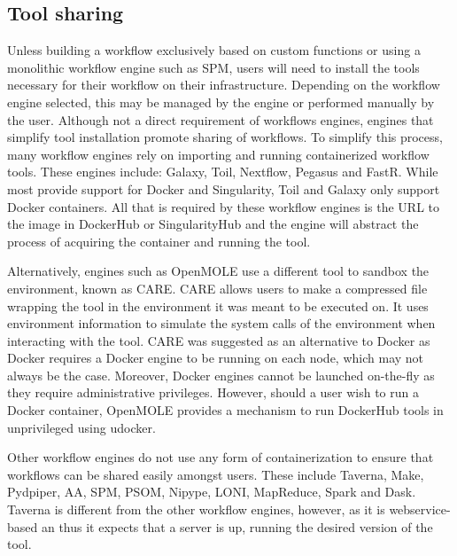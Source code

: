        \subsection{Tool sharing}\label{sharing}

            Unless building a workflow exclusively based on custom
            functions or using a monolithic workflow engine such as SPM, users
            will need to install the tools necessary for their workflow on
            their infrastructure. Depending on the workflow engine 
            selected, this may be managed by the engine or performed manually 
            by the user. Although not a direct requirement of workflows engines, 
            engines that simplify tool installation promote sharing of 
            workflows. To simplify this process, many workflow engines rely on 
            importing and running containerized workflow tools. These engines
            include: Galaxy, Toil, Nextflow, Pegasus and FastR. While most 
            provide support for Docker and Singularity, Toil and Galaxy only 
            support Docker containers. All that is required by these workflow 
            engines is the URL to the image in DockerHub or SingularityHub and
            the engine will abstract the process of acquiring the container and
            running the tool.

            Alternatively, engines such as OpenMOLE use a different tool to
            sandbox the environment, known as CARE. CARE allows 
            users to make a compressed file wrapping the tool in the 
            environment it was meant to be executed on. It uses environment 
            information to simulate the system calls of the environment when
            interacting with the tool. CARE was suggested as an alternative to
            Docker as Docker requires a Docker engine to be running on each 
            node, which may not always be the case. Moreover, Docker engines 
            cannot be launched on-the-fly as they require administrative 
            privileges. However, should a user wish to run a Docker container,
            OpenMOLE provides a mechanism to run DockerHub tools in 
            unprivileged using udocker.

            Other workflow engines do not use any form of containerization to
            ensure that workflows can be shared easily amongst users. These 
            include Taverna, Make, Pydpiper, AA, SPM, PSOM, Nipype, LONI, 
            MapReduce, Spark and Dask.
            Taverna is different from the other workflow engines, however, as 
            it is webservice-based an thus it expects that a server is up, 
            running the desired version of the tool.

